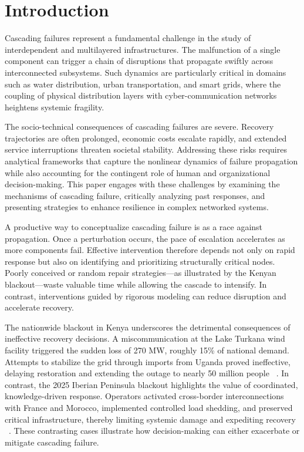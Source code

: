 \documentclass[runningheads]{llncs}
\begin{document}
\section{Introduction}
Cascading failures represent a fundamental challenge in the study of interdependent and multilayered infrastructures. The malfunction of a single component can trigger a chain of disruptions that propagate swiftly across interconnected subsystems. Such dynamics are particularly critical in domains such as water distribution, urban transportation, and smart grids, where the coupling of physical distribution layers with cyber-communication networks heightens systemic fragility.

The socio-technical consequences of cascading failures are severe. Recovery trajectories are often prolonged, economic costs escalate rapidly, and extended service interruptions threaten societal stability. Addressing these risks requires analytical frameworks that capture the nonlinear dynamics of failure propagation while also accounting for the contingent role of human and organizational decision-making. This paper engages with these challenges by examining the mechanisms of cascading failure, critically analyzing past responses, and presenting strategies to enhance resilience in complex networked systems.

A productive way to conceptualize cascading failure is as a race against propagation. Once a perturbation occurs, the pace of escalation accelerates as more components fail. Effective intervention therefore depends not only on rapid response but also on identifying and prioritizing structurally critical nodes. Poorly conceived or random repair strategies—as illustrated by the Kenyan blackout—waste valuable time while allowing the cascade to intensify. In contrast, interventions guided by rigorous modeling can reduce disruption and accelerate recovery.

The nationwide blackout in Kenya underscores the detrimental consequences of ineffective recovery decisions. A miscommunication at the Lake Turkana wind facility triggered the sudden loss of 270 MW, roughly 15\% of national demand. Attempts to stabilize the grid through imports from Uganda proved ineffective, delaying restoration and extending the outage to nearly 50 million people ~\cite{apkenya_aug23, apkenya_dec23, mwangi_kenya_2023}. In contrast, the 2025 Iberian Peninsula blackout highlights the value of coordinated, knowledge-driven response. Operators activated cross-border interconnections with France and Morocco, implemented controlled load shedding, and preserved critical infrastructure, thereby limiting systemic damage and expediting recovery ~\cite{cetinkaya_technical_2025}. These contrasting cases illustrate how decision-making can either exacerbate or mitigate cascading failure.
\end{document}

